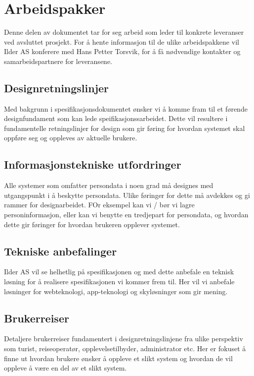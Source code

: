 \section{Arbeidspakker}

Denne delen av dokumentet tar for seg arbeid som leder til konkrete leveranser ved avsluttet prosjekt. For å hente informasjon til de ulike arbeidspakkene vil Ilder AS konferere med Hans Petter Torsvik, for å få nødvendige kontakter og samarbeidspartnere for leveransene.

\subsection{Designretningslinjer}
Med bakgrunn i spesifikasjonsdokumentet ønsker vi å komme fram til et førende designfundament som kan lede speifikasjonssarbeidet. Dette vil resultere i fundamentelle retningslinjer for design som gir føring for hvordan systemet skal oppføre seg og oppleves av aktuelle brukere. 

\subsection{Informasjonstekniske utfordringer}
Alle systemer som omfatter persondata i noen grad må designes med utgangspunkt i å beskytte persondata. Ulike føringer for dette må avdekkes og gi rammer for designarbeidet. FOr eksempel kan vi / bør vi lagre personinformasjon, eller kan vi benytte en tredjepart for persondata, og hvordan dette gir føringer for hvordan brukeren opplever systemet.

\subsection{Tekniske anbefalinger}
Ilder AS vil se helhetlig på spesifikasjonen og med dette anbefale en teknisk løsning for å realisere spesifikasjonen vi kommer frem til. Her vil vi anbefale løsninger for webteknologi, app-teknologi og skyløsninger som gir mening.

\subsection{Brukerreiser}
Detaljere brukerreiser fundamentert i designretningslinjene fra ulike perspektiv som turist, reiseoperatør, opplevelsetilbyder, administrator etc. Her er fokuset å finne ut hvordan brukere ønsker å oppleve et slikt system og hvordan de vil oppleve å være en del av et slikt system.

